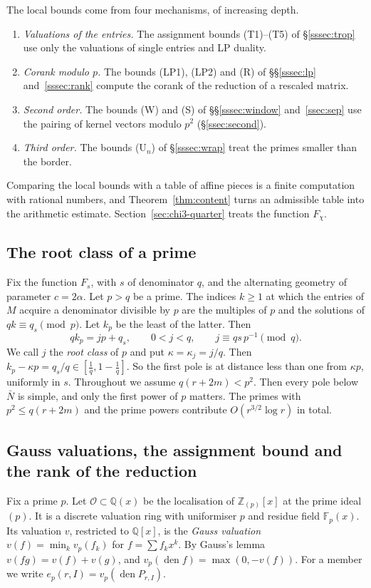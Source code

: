 \documentclass[11pt]{amsart}
\theoremstyle{definition}
\theoremstyle{remark}
\numberwithin{equation}{section}
\newcommand{\Z}{\mathbb Z}
\newcommand{\Q}{\mathbb Q}
\newcommand{\F}{\mathbb F}
\newcommand{\den}{\operatorname{den}}
\newcommand{\cO}{\mathcal O}
\begin{document}
The local bounds come from four mechanisms, of increasing depth.
\begin{enumerate}[label=(\alph*)]
\item \emph{Valuations of the entries.} The assignment bounds (T1)--(T5) of \S\ref{sssec:trop} use only the
 valuations of single entries and LP duality.
\item \emph{Corank modulo $p$.} The bounds (LP1), (LP2) and (R) of \S\S\ref{sssec:lp} and~\ref{sssec:rank} compute the
 corank of the reduction of a rescaled matrix.
\item \emph{Second order.} The bounds (W) and (S) of \S\S\ref{sssec:window} and~\ref{ssec:sep} use the pairing of kernel
 vectors modulo $p^2$ (\S\ref{ssec:second}).
\item \emph{Third order.} The bounds (U$_n$) of \S\ref{sssec:wrap} treat the primes smaller than the border.
\end{enumerate}
Comparing the local bounds with a table of affine pieces is a finite computation with rational numbers, and
Theorem~\ref{thm:content} turns an admissible table into the arithmetic estimate. Section~\ref{sec:chi3-quarter} treats the
function $F_\chi$.

\subsection{The root class of a prime}
Fix the function $F_s$, with $s$ of denominator $q$, and the alternating geometry of parameter $c=2\alpha$.
Let $p>q$ be a prime. The indices $k\ge1$ at which the entries of $M$ acquire a denominator divisible by $p$ are the
multiples of $p$ and the solutions of $qk\equiv q_s\pmod p$. Let $k_p$ be the least of the latter. Then
\[
 qk_p=jp+q_s,\qquad 0<j<q,\qquad j\equiv qs\,p^{-1}\pmod q .
\]
We call $j$ the \emph{root class} of $p$ and put $\kappa=\kappa_j=j/q$. Then $k_p-\kappa p=q_s/q\in[\frac1q,1-\frac1q]$. So
the first pole is at distance less than one from $\kappa p$, uniformly in $s$. Throughout we assume $q(r+2m)<p^2$. Then
every pole below $\bar N$ is simple, and only the first power of $p$ matters. The primes with $p^2\le q(r+2m)$ and the prime
powers contribute $O(r^{3/2}\log r)$ in total.

\subsection{Gauss valuations, the assignment bound and the rank of the reduction}
Fix a prime $p$. Let $\cO\subset\Q(x)$ be the localisation of $\Z_{(p)}[x]$ at the prime ideal $(p)$. It is a discrete
valuation ring with uniformiser $p$ and residue field $\F_p(x)$. Its valuation $v$, restricted to $\Q[x]$, is the
\emph{Gauss valuation} $v(f)=\min_k v_p(f_k)$ for $f=\sum f_kx^k$. By Gauss's lemma $v(fg)=v(f)+v(g)$, and
$v_p(\den f)=\max(0,-v(f))$. For a member we write $e_p(r,I)=v_p(\den P_{r,I})$.
\end{document}
